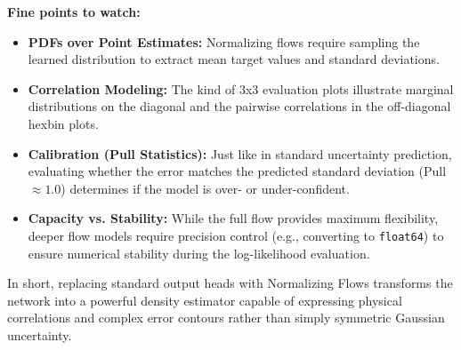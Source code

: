 \documentclass[11pt,a4paper]{article}
\begin{document}
\textbf{Fine points to watch:}

\begin{itemize}
    \item \textbf{PDFs over Point Estimates:} Normalizing flows require sampling the learned distribution to extract mean target values and standard deviations.
    \item \textbf{Correlation Modeling:} The kind of 3x3 evaluation plots illustrate marginal distributions on the diagonal and the pairwise correlations in the off-diagonal hexbin plots.
    \item \textbf{Calibration (Pull Statistics):} Just like in standard uncertainty prediction, evaluating whether the error matches the predicted standard deviation (Pull $\approx 1.0$) determines if the model is over- or under-confident.
    \item \textbf{Capacity vs. Stability:} While the full flow provides maximum flexibility, deeper flow models require precision control (e.g., converting to \texttt{float64}) to ensure numerical stability during the log-likelihood evaluation.
\end{itemize}

In short, replacing standard output heads with Normalizing Flows transforms the network into a powerful density estimator capable of expressing physical correlations and complex error contours rather than simply symmetric Gaussian uncertainty.
\end{document}
